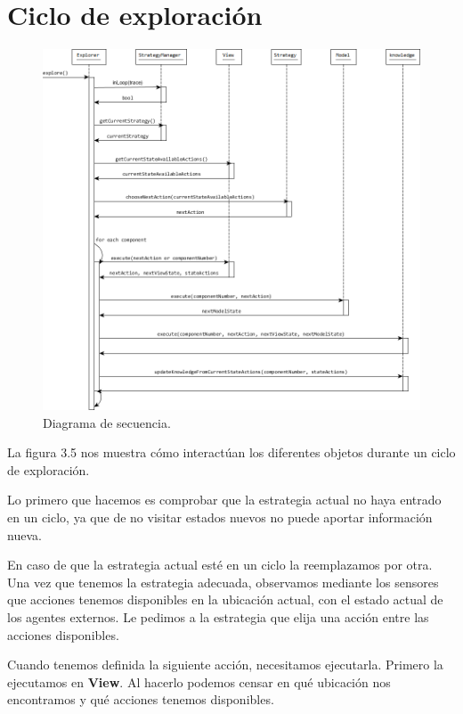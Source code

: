 \section{Ciclo de exploración}

\begin{figure}[H]
  \centering
    \includegraphics[width=1.0\textwidth]{Imagenes/Algoritmo/Secuencia_explorar.png}
  \caption{Diagrama de secuencia.}
  \label{fig:Secuencia_explorar}
\end{figure}

La figura 3.5 nos muestra cómo interactúan los diferentes objetos durante un ciclo de exploración.

Lo primero que hacemos es comprobar que la estrategia actual no haya entrado en un ciclo, ya que de no visitar estados nuevos no puede aportar información nueva.

En caso de que la estrategia actual esté en un ciclo la reemplazamos por otra. Una vez que tenemos la estrategia adecuada, observamos mediante los sensores que 
acciones tenemos disponibles en la ubicación actual, con el estado actual de los agentes externos. Le pedimos a la estrategia que elija una acción entre las 
acciones disponibles.

Cuando tenemos definida la siguiente acción, necesitamos ejecutarla. Primero la ejecutamos en \textbf{View}. Al hacerlo podemos censar en qué ubicación nos 
encontramos y qué acciones tenemos disponibles.

